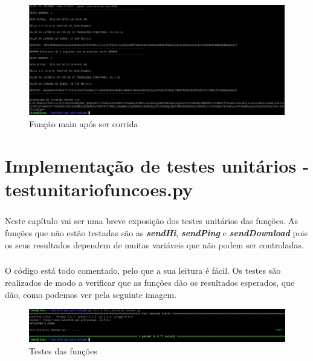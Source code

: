 \documentclass{report}
\begin{document}
\begin{figure}[H]
\centering
\includegraphics[width=1.3\linewidth]{main.png}
\caption{Função main após ser corrida}
\label{getFileSint}
\end{figure}


\newpage


\chapter{Implementação de testes unitários - test\textunderscore unitario\textunderscore funcoes.py}
\label{chap.Implementacao testes}
\paragraph{}
Neste capítulo vai ser uma breve exposição dos testes unitários das funções.
As funções que não estão testadas são as \textbf{\textit{sendHi}}, \textbf{\textit{sendPing}} e \textbf{\textit{sendDownload}} pois os seus resultados dependem de muitas variáveis que não podem ser controladas.
\paragraph{}
O código está todo comentado, pelo que a sua leitura é fácil.
Os testes são realizados de modo a verificar que as funções dão os resultados esperados, que dão, como podemos ver pela seguinte imagem.


\begin{figure}[H]
\centering
\includegraphics[width=1.3\linewidth]{testes.png}
\caption{Testes das funções}
\label{getFileSint}
\end{figure}


\newpage
\end{document}
